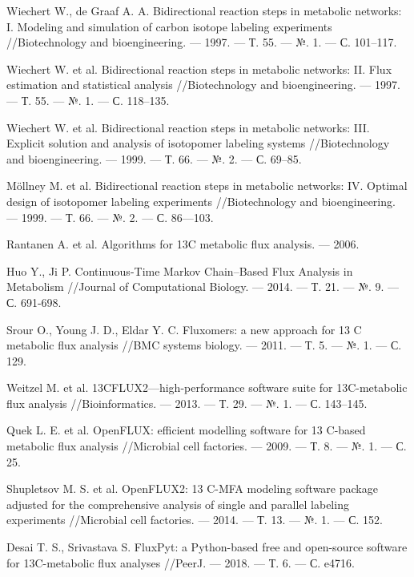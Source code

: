 \documentclass[a4paper, 12pt, left=30mm, right=15mm, top=20mm, bottom=20mm]{report}
\begin{document}
\begin{thebibliography}{XXXX}
	Wiechert W., de Graaf A. A. Bidirectional reaction steps in metabolic networks: I. Modeling and simulation of carbon isotope labeling experiments //Biotechnology and bioengineering. --- 1997. --- Т. 55. --- №. 1. --- С. 101--117.
	
	Wiechert W. et al. Bidirectional reaction steps in metabolic networks: II. Flux estimation and statistical analysis //Biotechnology and bioengineering. --- 1997. --- Т. 55. --- №. 1. --- С. 118--135.
	
	Wiechert W. et al. Bidirectional reaction steps in metabolic networks: III. Explicit solution and analysis of isotopomer labeling systems //Biotechnology and bioengineering. --- 1999. --- Т. 66. --- №. 2. --- С. 69--85.
	
	Möllney M. et al. Bidirectional reaction steps in metabolic networks: IV. Optimal design of isotopomer labeling experiments //Biotechnology and bioengineering. --- 1999. --- Т. 66. --- №. 2. --- С. 86---103.
	
	Rantanen A. et al. Algorithms for 13C metabolic flux analysis. --- 2006.
	
	Huo Y., Ji P. Continuous-Time Markov Chain–Based Flux Analysis in Metabolism //Journal of Computational Biology. --- 2014. --- Т. 21. --- №. 9. --- С. 691-698.
	
	Srour O., Young J. D., Eldar Y. C. Fluxomers: a new approach for 13 C metabolic flux analysis //BMC systems biology. --- 2011. --- Т. 5. --- №. 1. --- С. 129.
		
	Weitzel M. et al. 13CFLUX2—high-performance software suite for 13C-metabolic flux analysis //Bioinformatics. --- 2013. --- Т. 29. --- №. 1. --- С. 143--145.
	
	Quek L. E. et al. OpenFLUX: efficient modelling software for 13 C-based metabolic flux analysis //Microbial cell factories. --- 2009. --- Т. 8. --- №. 1. --- С. 25.
	
	Shupletsov M. S. et al. OpenFLUX2: 13 C-MFA modeling software package adjusted for the comprehensive analysis of single and parallel labeling experiments //Microbial cell factories. --- 2014. --- Т. 13. --- №. 1. --- С. 152.
	
	Desai T. S., Srivastava S. FluxPyt: a Python-based free and open-source software for 13C-metabolic flux analyses //PeerJ. --- 2018. --- Т. 6. --- С. e4716.
	

\end{thebibliography}
\end{document}
